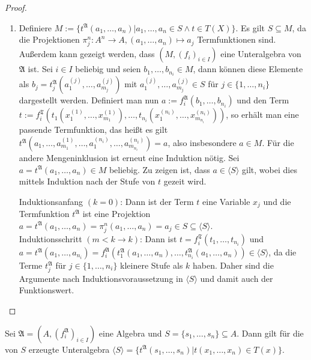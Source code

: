 \begin{proof}
\begin{enumerate}
        \item Definiere $M:=\{t^\mathfrak{A}(a_1,\ldots,a_n)\vert a_1,\ldots,a_n\in S\land t\in T(X)\}$.
        Es gilt $S\subseteq M$, da die Projektionen $\pi_j^n:A^n\to A, (a_1,\ldots,a_n)\mapsto a_j$ Termfunktionen sind.
        Außerdem kann gezeigt werden, dass $(M,(f_i)_{i\in I})$ eine Unteralgebra von $\mathfrak{A}$ ist. Sei $i\in I$ beliebig
        und seien $b_1,\ldots,b_{n_i}\in M$, dann können diese Elemente als $b_j=t_j^\mathfrak{A}(a_1^{(j)},\ldots,a_{m_j}^{(j)})$
        mit $a_1^{(j)},\ldots,a_{m_j}^{(j)}\in S$ für $j\in \{1,\ldots,n_i\}$ dargestellt werden. Definiert man nun $a:=f^\mathfrak{A}_i(b_1,\ldots,b_{n_i})$
        und den Term $t:=f_i^\mathfrak{T}(t_1(x_1^{(1)},\ldots,x_{m_1}^{(1)}),\ldots,t_{n_i}(x_1^{(n_i)},\ldots,x_{m_{n_i}}^{(n_i)}))$,
        so erhält man eine passende Termfunktion, das heißt es gilt $t^\mathfrak{A}(a_1,\ldots,a_{m_1}^{(1)},\ldots,a_1^{(n_i)},\ldots,a_{m_{n_i}}^{(n_i)})=a$,
        also insbesondere $a\in M$. Für die andere Mengeninklusion ist erneut eine Induktion nötig.
        Sei $a=t^\mathfrak{A}(a_1,\ldots,a_n)\in M$ beliebig. Zu zeigen ist, dass $a\in \langle S\rangle$ gilt,
        wobei dies mittels Induktion nach der Stufe von $t$ gezeit wird.

        Induktionsanfang $(k=0)$: Dann ist der Term $t$ eine Variable $x_j$ und die Termfunktion
        $t^\mathfrak{A}$ ist eine Projektion $a=t^\mathfrak{A}(a_1,\ldots,a_n)=\pi_j^n(a_1,\ldots,a_n)=a_j\in S\subseteq \langle S\rangle$.\\
        Induktionsschritt $(m<k\to k)$: Dann ist $t=f^\mathfrak{T}_i(t_1,\ldots,t_{n_i})$ und
        $a=t^\mathfrak{A}(a_1,\ldots,a_{n_i})=f^\mathfrak{A}_i(t^\mathfrak{A}_1(a_1,\ldots,a_n),\ldots,t^\mathfrak{A}_{n_i}(a_1,\ldots,a_n))\in\langle S\rangle$,
        da die Terme $t^\mathfrak{A}_j$ für $j\in\{1,\ldots,n_i\}$ kleinere Stufe als $k$ haben. Daher
        sind die Argumente nach Induktionsvoraussetzung in $\langle S\rangle$ und damit auch
        der Funktionswert.
    \end{enumerate}
\end{proof}

\begin{corollary}
    Sei $\mathfrak{A}=(A,(f^\mathfrak{A}_i)_{i\in I})$ eine Algebra und $S=\{s_1,\ldots,s_n\}\subseteq A$.
    Dann gilt für die von $S$ erzeugte Unteralgebra $\langle S\rangle=\{t^\mathfrak{A}(s_1,\ldots,s_n)\vert t(x_1,\ldots,x_n)\in T(x)\}$.
\end{corollary}

